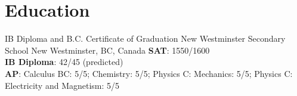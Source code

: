 \section{Education}


{IB Diploma and B.C. Certificate of Graduation}
{New Westminster Secondary School}
{New Westminster, BC, Canada}
{}
{
  \textbf{SAT}: 1550/1600\\
  \textbf{IB Diploma}: 42/45 (predicted)\\
  \textbf{AP}: Calculus BC: 5/5; Chemistry: 5/5; Physics C: Mechanics: 5/5; Physics C: Electricity and Magnetism: 5/5
}
